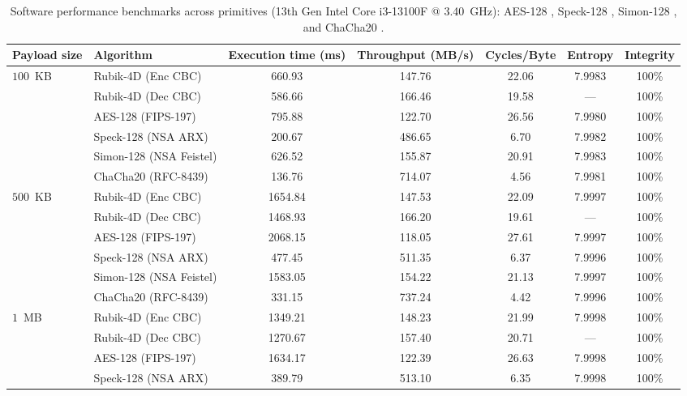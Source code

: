 \documentclass[10pt,twocolumn]{article}
\begin{document}
\begin{table}[t]
\caption{Software performance benchmarks across primitives (13th Gen Intel Core i3-13100F @ 3.40~GHz): AES-128 \cite{nist2001fips}, Speck-128 \cite{beaulieu2015simon}, Simon-128 \cite{beaulieu2015simon}, and ChaCha20 \cite{nir2018chacha20}.}
\label{tab:benchmarks_all}
\centering
\small
\begin{tabular}{@{}llccccc@{}}
\toprule
\textbf{Payload size} & \textbf{Algorithm} & \textbf{Execution time (ms)} & \textbf{Throughput (MB/s)} & \textbf{Cycles/Byte} & \textbf{Entropy} & \textbf{Integrity} \\ \midrule
\multirow{6}{*}{$100$~KB} 
 & Rubik-4D (Enc CBC)        & 660.93  & 147.76 & 22.06 & 7.9983 & 100\% \\
 & Rubik-4D (Dec CBC)        & 586.66  & 166.46 & 19.58 & --- & 100\% \\
 & AES-128 (FIPS-197)          & 795.88  & 122.70 & 26.56 & 7.9980 & 100\% \\
 & Speck-128 (NSA ARX)          & 200.67  & 486.65 & 6.70  & 7.9982 & 100\% \\
 & Simon-128 (NSA Feistel)      & 626.52  & 155.87 & 20.91 & 7.9983 & 100\% \\
 & ChaCha20 (RFC-8439)          & 136.76  & 714.07 & 4.56  & 7.9981 & 100\% \\ \midrule
\multirow{6}{*}{$500$~KB} 
 & Rubik-4D (Enc CBC)        & 1654.84 & 147.53 & 22.09 & 7.9997 & 100\% \\
 & Rubik-4D (Dec CBC)        & 1468.93 & 166.20 & 19.61 & --- & 100\% \\
 & AES-128 (FIPS-197)          & 2068.15 & 118.05 & 27.61 & 7.9997 & 100\% \\
 & Speck-128 (NSA ARX)          & 477.45  & 511.35 & 6.37  & 7.9996 & 100\% \\
 & Simon-128 (NSA Feistel)      & 1583.05 & 154.22 & 21.13 & 7.9997 & 100\% \\
 & ChaCha20 (RFC-8439)          & 331.15  & 737.24 & 4.42  & 7.9996 & 100\% \\ \midrule
\multirow{6}{*}{$1$~MB} 
 & Rubik-4D (Enc CBC)        & 1349.21 & 148.23 & 21.99 & 7.9998 & 100\% \\
 & Rubik-4D (Dec CBC)        & 1270.67 & 157.40 & 20.71 & --- & 100\% \\
 & AES-128 (FIPS-197)          & 1634.17 & 122.39 & 26.63 & 7.9998 & 100\% \\
 & Speck-128 (NSA ARX)          & 389.79  & 513.10 & 6.35  & 7.9998 & 100\% \\

\end{tabular}
\end{table}
\end{document}
